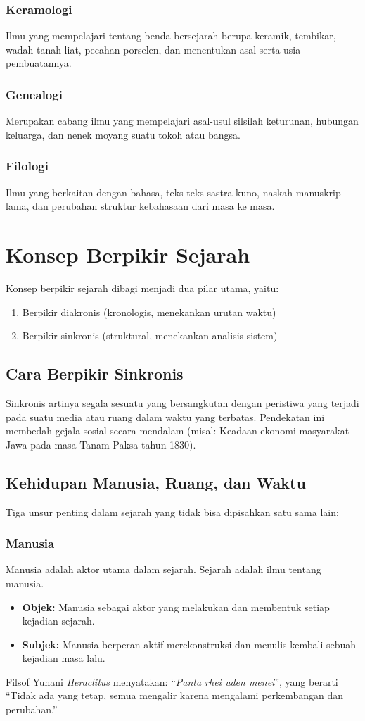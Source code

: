 \documentclass[12pt, a4paper]{article}
\begin{document}
\subsubsection{Keramologi}
Ilmu yang mempelajari tentang benda bersejarah berupa keramik, tembikar, wadah tanah liat, pecahan porselen, dan menentukan asal serta usia pembuatannya.
\subsubsection{Genealogi}
Merupakan cabang ilmu yang mempelajari asal-usul silsilah keturunan, hubungan keluarga, dan nenek moyang suatu tokoh atau bangsa.
\subsubsection{Filologi}
Ilmu yang berkaitan dengan bahasa, teks-teks sastra kuno, naskah manuskrip lama, dan perubahan struktur kebahasaan dari masa ke masa.

\section{Konsep Berpikir Sejarah}
Konsep berpikir sejarah dibagi menjadi dua pilar utama, yaitu:
\begin{enumerate}
	\item Berpikir diakronis (kronologis, menekankan urutan waktu)
	\item Berpikir sinkronis (struktural, menekankan analisis sistem)
\end{enumerate}

\subsection{Cara Berpikir Sinkronis}
Sinkronis artinya segala sesuatu yang bersangkutan dengan peristiwa yang terjadi pada suatu media atau ruang dalam waktu yang terbatas. Pendekatan ini membedah gejala sosial secara mendalam (misal: Keadaan ekonomi masyarakat Jawa pada masa Tanam Paksa tahun 1830).

\subsection{Kehidupan Manusia, Ruang, dan Waktu}
Tiga unsur penting dalam sejarah yang tidak bisa dipisahkan satu sama lain:
\subsubsection{Manusia}
Manusia adalah aktor utama dalam sejarah. Sejarah adalah ilmu tentang manusia.
\begin{itemize}
	\item \textbf{Objek:} Manusia sebagai aktor yang melakukan dan membentuk setiap kejadian sejarah.
	\item \textbf{Subjek:} Manusia berperan aktif merekonstruksi dan menulis kembali sebuah kejadian masa lalu.
\end{itemize}
\noindent Filsof Yunani \textit{Heraclitus} menyatakan: ``\textit{Panta rhei uden menei}'', yang berarti ``Tidak ada yang tetap, semua mengalir karena mengalami perkembangan dan perubahan.''
\end{document}
